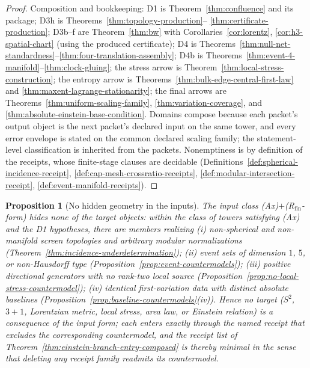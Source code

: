 \documentclass[11pt]{article}
\newtheorem{proposition}[theorem]{Proposition}
\begin{document}
\begin{proof}
Composition and bookkeeping: D1 is Theorem~\ref{thm:confluence} and its
package; D3h is Theorems~\ref{thm:topology-production}--%
\ref{thm:certificate-production}; D3b--f are
Theorem~\ref{thm:bw} with Corollaries~\ref{cor:lorentz},
\ref{cor:h3-spatial-chart} (using the produced certificate); D4 is
Theorems~\ref{thm:null-net-standardness}--\ref{thm:four-translation-assembly};
D4b is Theorems~\ref{thm:event-4-manifold}--\ref{thm:clock-gluing}; the
stress arrow is Theorem~\ref{thm:local-stress-construction}; the entropy
arrow is Theorems~\ref{thm:bulk-edge-central-first-law} and
\ref{thm:maxent-lagrange-stationarity}; the final arrows are
Theorems~\ref{thm:uniform-scaling-family},
\ref{thm:variation-coverage}, and
\ref{thm:absolute-einstein-base-condition}. Domains compose because each
packet's output object is the next packet's declared input on the same
tower, and every error envelope is stated on the common declared scaling
family; the statement-level classification is inherited from the packets.
Nonemptiness is by definition of the receipts, whose finite-stage clauses
are decidable (Definitions~\ref{def:spherical-incidence-receipt},
\ref{def:cap-mesh-crossratio-receipts},
\ref{def:modular-intersection-receipt},
\ref{def:event-manifold-receipts}).
\end{proof}

\begin{proposition}[No hidden geometry in the inputs]
\label{prop:no-hidden-geometry}
The input class (Ax)\(+\)(R\(_{\mathrm{fin}}\)-\emph{form}) hides none of the
target objects: within the class of towers satisfying (Ax) and the D1
hypotheses, there are members realizing
(i) non-spherical and non-manifold screen topologies and arbitrary modular
normalizations (Theorem~\ref{thm:incidence-underdetermination});
(ii) event sets of dimension \(1\), \(5\), or non-Hausdorff type
(Proposition~\ref{prop:event-countermodels});
(iii) positive directional generators with no rank-two local source
(Proposition~\ref{prop:no-local-stress-countermodel});
(iv) identical first-variation data with distinct absolute baselines
(Proposition~\ref{prop:baseline-countermodels}(iv)).
Hence no target (\(S^2\), \(3{+}1\), Lorentzian metric, local stress,
area law, or Einstein relation) is a consequence of the input
\emph{form}; each enters exactly through the named receipt that excludes the
corresponding countermodel, and the receipt list of
Theorem~\ref{thm:einstein-branch-entry-composed} is thereby minimal in the
sense that deleting any receipt family readmits its countermodel.
\end{proposition}
\end{document}

